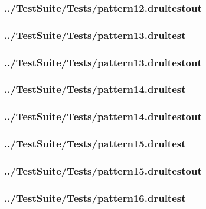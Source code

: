 \begin{changemargin}{-1in}{-1in}
\subsubsection{../TestSuite/Tests/pattern12.drultestout}


\subsubsection{../TestSuite/Tests/pattern13.drultest}


\subsubsection{../TestSuite/Tests/pattern13.drultestout}


\subsubsection{../TestSuite/Tests/pattern14.drultest}


\subsubsection{../TestSuite/Tests/pattern14.drultestout}


\subsubsection{../TestSuite/Tests/pattern15.drultest}


\subsubsection{../TestSuite/Tests/pattern15.drultestout}


\subsubsection{../TestSuite/Tests/pattern16.drultest}



\end{changemargin}
